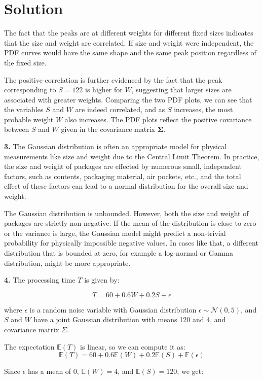 \documentclass{harvardml}
\theoremstyle{definition}
\theoremstyle{plain}
\newenvironment{solution}
  {\color{blue}\section*{Solution}}
{}
\begin{document}
\begin{solution}
\medskip
The fact that the peaks are at different weights for different fixed sizes indicates that the size and weight are correlated. If size and weight were independent, the PDF curves would have the same shape and the same peak position regardless of the fixed size.

\medskip
The positive correlation is further evidenced by the fact that the peak corresponding to \( S = 122 \) is higher for \( W \), suggesting that larger sizes are associated with greater weights. Comparing the two PDF plots, we can see that the variables \( S \) and \( W \) are indeed correlated, and as \( S \) increases, the most probable weight \( W \) also increases. The PDF plots reflect the positive covariance between \( S \) and \( W \) given in the covariance matrix \(\boldsymbol{\Sigma}\).


\bigskip
\noindent \textbf{3.}
The Gaussian distribution is often an appropriate model for physical measurements like size and weight due to the Central Limit Theorem. In practice, the size and weight of packages are effected by numerous small, independent factors, such as contents, packaging material, air pockets, etc., and the total effect of these factors can lead to a normal distribution for the overall size and weight.

\medskip
The Gaussian distribution is unbounded. However, both the size and weight of packages are strictly non-negative. If the mean of the distribution is close to zero or the variance is large, the Gaussian model might predict a non-trivial probability for physically impossible negative values. In cases like that, a different distribution that is bounded at zero, for example a log-normal or Gamma distribution, might be more appropriate.

\bigskip
\noindent \textbf{4.}
The processing time \(T\) is given by:

\[ T = 60 + 0.6W + 0.2S + \epsilon \]

where \(\epsilon\) is a random noise variable with Gaussian distribution \(\epsilon \sim \mathcal{N}(0,5)\), and \(S\) and \(W\) have a joint Gaussian distribution with means 120 and 4, and covariance matrix \(\Sigma\).

\medskip
The expectation \(\mathbb{E}(T)\) is linear, so we can compute it as:
\[ \mathbb{E}(T) = 60 + 0.6\mathbb{E}(W) + 0.2\mathbb{E}(S) + \mathbb{E}(\epsilon) \]

Since \(\epsilon\) has a mean of 0, \(\mathbb{E}(W) = 4\), and \(\mathbb{E}(S) = 120\), we get:


\end{solution}
\end{document}
